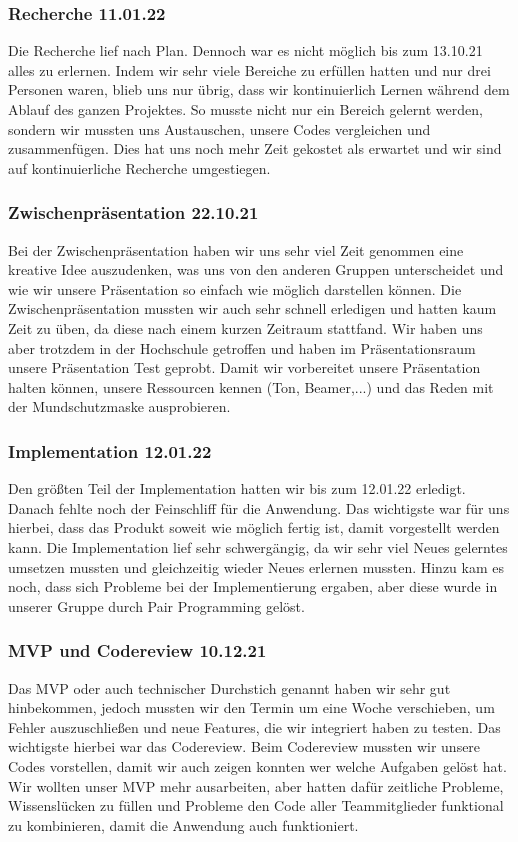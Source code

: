 \subsubsection{Recherche 11.01.22}
Die Recherche lief nach Plan. Dennoch war es nicht möglich bis zum 13.10.21 alles zu erlernen. 
Indem wir sehr viele Bereiche zu erfüllen hatten und nur drei Personen waren,
blieb uns nur übrig, dass wir kontinuierlich Lernen während dem Ablauf des ganzen Projektes. 
So musste nicht nur ein Bereich gelernt werden, sondern wir mussten uns Austauschen, unsere Codes vergleichen und zusammenfügen. 
Dies hat uns noch mehr Zeit gekostet als erwartet und wir sind auf kontinuierliche Recherche umgestiegen.

\subsubsection{Zwischenpräsentation 22.10.21}
Bei der Zwischenpräsentation haben wir uns sehr viel Zeit genommen eine kreative Idee auszudenken, 
was uns von den anderen Gruppen unterscheidet und wie wir unsere Präsentation so einfach wie möglich darstellen können. 
Die Zwischenpräsentation mussten wir auch sehr schnell erledigen und hatten kaum Zeit zu üben, da diese nach einem kurzen Zeitraum stattfand. 
Wir haben uns aber trotzdem in der Hochschule getroffen und haben im Präsentationsraum unsere Präsentation Test geprobt. 
Damit wir vorbereitet unsere Präsentation halten können, unsere Ressourcen kennen (Ton, Beamer,...) und das Reden mit der Mundschutzmaske ausprobieren.

\subsubsection{Implementation 12.01.22}
Den größten Teil der Implementation hatten wir bis zum 12.01.22 erledigt. 
Danach fehlte noch der Feinschliff für die Anwendung.
Das wichtigste war für uns hierbei, dass das Produkt soweit wie möglich fertig ist, damit vorgestellt werden kann.
Die Implementation lief sehr schwergängig, da wir sehr viel Neues gelerntes umsetzen mussten und gleichzeitig wieder Neues erlernen mussten.
Hinzu kam es noch, dass sich Probleme bei der Implementierung ergaben, aber diese wurde in unserer Gruppe durch Pair Programming gelöst.

\subsubsection{MVP und Codereview 10.12.21}
Das MVP oder auch technischer Durchstich genannt haben wir sehr gut hinbekommen, jedoch mussten wir den Termin um eine Woche verschieben, 
um Fehler auszuschließen und neue Features, die wir integriert haben zu testen.
Das wichtigste hierbei war das Codereview. Beim Codereview mussten wir unsere Codes vorstellen, damit wir auch zeigen konnten wer welche Aufgaben gelöst hat. 
Wir wollten unser MVP mehr ausarbeiten, aber hatten dafür zeitliche Probleme, Wissenslücken zu füllen und 
Probleme den Code aller Teammitglieder funktional zu kombinieren, damit die Anwendung auch funktioniert. 

